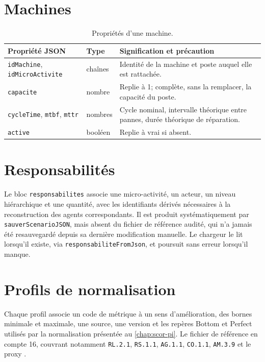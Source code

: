 \section{Machines}

\begin{table}[H]
  \centering
  \small
  \begin{tabularx}{\textwidth}{L{0.24\textwidth} L{0.10\textwidth} Y}
    \toprule
    Propriété JSON & Type & Signification et précaution \\
    \midrule
    \texttt{idMachine}, \texttt{idMicroActivite} & chaînes & Identité de la machine et poste auquel elle est rattachée. \\
    \texttt{capacite} & nombre & Replie à 1; complète, sans la remplacer, la capacité du poste. \\
    \texttt{cycleTime}, \texttt{mtbf}, \texttt{mttr} & nombres & Cycle nominal, intervalle théorique entre pannes, durée théorique de réparation. \\
    \texttt{active} & booléen & Replie à vrai si absent. \\
    \bottomrule
  \end{tabularx}
  \caption{Propriétés d'une machine.}
  \label{tab:json-machines}
\end{table}

\section{Responsabilités}

Le bloc \texttt{responsabilites} associe une micro-activité, un acteur, un niveau hiérarchique et une quantité, avec les identifiants dérivés nécessaires à la reconstruction des agents correspondants. Il est produit systématiquement par \texttt{sauver\allowbreak ScenarioJSON}, mais absent du fichier de référence audité, qui n'a jamais été resauvegardé depuis sa dernière modification manuelle. Le chargeur le lit lorsqu'il existe, via \texttt{responsabiliteFromJson}, et poursuit sans erreur lorsqu'il manque.

\section{Profils de normalisation}

Chaque profil associe un code de métrique à un sens d'amélioration, des bornes minimale et maximale, une source, une version et les repères Bottom et Perfect utilisés par la normalisation présentée au \cref{chap:scor-pi}. Le fichier de référence en compte 16, couvrant notamment \texttt{RL.2.1}, \texttt{RS.1.1}, \texttt{AG.1.1}, \texttt{CO.1.1}, \texttt{AM.3.9} et le proxy .

